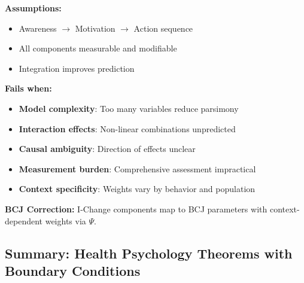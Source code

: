 \begin{tcolorbox}[colback=red!5!white, colframe=red!75!black, title=Boundary Condition: Where I-Change Fails]
\textbf{Assumptions:}
\begin{itemize}[nosep]
\item Awareness $\to$ Motivation $\to$ Action sequence
\item All components measurable and modifiable
\item Integration improves prediction
\end{itemize}

\textbf{Fails when:}
\begin{itemize}[nosep]
\item \textbf{Model complexity}: Too many variables reduce parsimony
\item \textbf{Interaction effects}: Non-linear combinations unpredicted
\item \textbf{Causal ambiguity}: Direction of effects unclear
\item \textbf{Measurement burden}: Comprehensive assessment impractical
\item \textbf{Context specificity}: Weights vary by behavior and population
\end{itemize}

\textbf{BCJ Correction:} I-Change components map to BCJ parameters with context-dependent weights via $\Psi$.
\end{tcolorbox}

\subsection{Summary: Health Psychology Theorems with Boundary Conditions}

